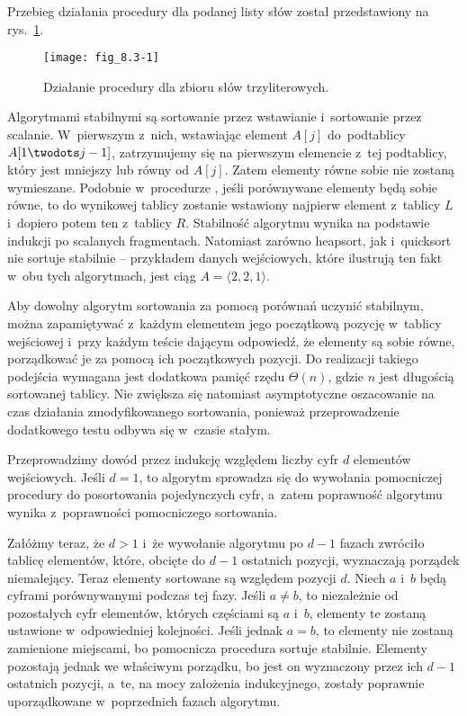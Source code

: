 
\exercise %
Przebieg działania procedury  dla podanej listy słów został przedstawiony na rys.~\ref{fig:8.3-1}.
\begin{figure}[ht]
	\begin{center}
		\texttt{[image: fig\_8.3-1]}
	\end{center}
	\caption{Działanie procedury  dla zbioru słów trzyliterowych.} \label{fig:8.3-1}
\end{figure}

\exercise %
Algorytmami stabilnymi są sortowanie przez wstawianie i~sortowanie przez scalanie. W~pierwszym z~nich, wstawiając element $A[j]$ do~podtablicy $A[1\twodots j-1]$, zatrzymujemy się na pierwszym elemencie z~tej podtablicy, który jest mniejszy lub równy od $A[j]$. Zatem elementy równe sobie nie zostaną wymieszane. Podobnie w~procedurze , jeśli porównywane elementy będą sobie równe, to do wynikowej tablicy zostanie wstawiony najpierw element z~tablicy $L$ i~dopiero potem ten z~tablicy $R$. Stabilność algorytmu wynika na podstawie indukcji po scalanych fragmentach. Natomiast zarówno heapsort, jak i~quicksort nie sortuje stabilnie -- przykładem danych wejściowych, które ilustrują ten fakt w~obu tych algorytmach, jest ciąg $A=\langle2,2,1\rangle$.

Aby dowolny algorytm sortowania za pomocą porównań uczynić stabilnym, można zapamiętywać z~każdym elementem jego początkową pozycję w~tablicy wejściowej i~przy każdym teście dającym odpowiedź, że elementy są sobie równe, porządkować je za pomocą ich początkowych pozycji. Do realizacji takiego podejścia wymagana jest dodatkowa pamięć rzędu $\Theta(n)$, gdzie $n$ jest długością sortowanej tablicy. Nie zwiększa się natomiast asymptotyczne oszacowanie na czas działania zmodyfikowanego sortowania, ponieważ przeprowadzenie dodatkowego testu odbywa się w~czasie stałym.

\exercise %
Przeprowadzimy dowód przez indukcję względem liczby cyfr $d$ elementów wejściowych. Jeśli $d=1$, to algorytm  sprowadza się do wywołania pomocniczej procedury do posortowania pojedynczych cyfr, a~zatem poprawność algorytmu wynika z~poprawności pomocniczego sortowania.

Załóżmy teraz, że $d>1$ i~że wywołanie algorytmu  po $d-1$ fazach zwróciło tablicę elementów, które, obcięte do $d-1$ ostatnich pozycji, wyznaczają porządek niemalejący. Teraz elementy sortowane są względem pozycji $d$. Niech $a$ i~$b$ będą cyframi porównywanymi podczas tej fazy. Jeśli $a\ne b$, to niezależnie od pozostałych cyfr elementów, których częściami są $a$ i~$b$, elementy te zostaną ustawione w~odpowiedniej kolejności. Jeśli jednak $a=b$, to elementy nie zostaną zamienione miejscami, bo pomocnicza procedura sortuje stabilnie. Elementy pozostają jednak we właściwym porządku, bo jest on wyznaczony przez ich $d-1$ ostatnich pozycji, a~te, na mocy założenia indukcyjnego, zostały poprawnie uporządkowane w~poprzednich fazach algorytmu.

